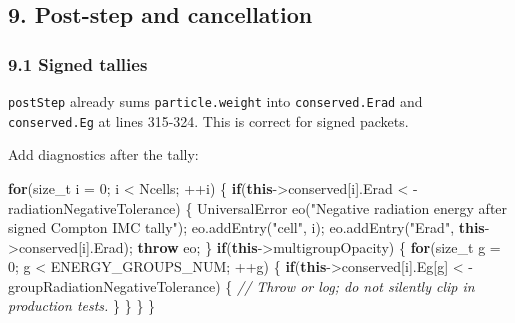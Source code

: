 \documentclass[
]{article}
\newenvironment{Shaded}{}{}
\newcommand{\CommentTok}[1]{\textcolor[rgb]{0.38,0.63,0.69}{\textit{#1}}}
\newcommand{\ControlFlowTok}[1]{\textcolor[rgb]{0.00,0.44,0.13}{\textbf{#1}}}
\newcommand{\DataTypeTok}[1]{\textcolor[rgb]{0.56,0.13,0.00}{#1}}
\newcommand{\DecValTok}[1]{\textcolor[rgb]{0.25,0.63,0.44}{#1}}
\newcommand{\KeywordTok}[1]{\textcolor[rgb]{0.00,0.44,0.13}{\textbf{#1}}}
\newcommand{\NormalTok}[1]{#1}
\newcommand{\OperatorTok}[1]{\textcolor[rgb]{0.40,0.40,0.40}{#1}}
\newcommand{\StringTok}[1]{\textcolor[rgb]{0.25,0.44,0.63}{#1}}
\begin{document}
\subsection{9. Post-step and
cancellation}\label{post-step-and-cancellation}

\subsubsection{9.1 Signed tallies}\label{signed-tallies}

\texttt{postStep} already sums \texttt{particle.weight} into
\texttt{conserved.Erad} and \texttt{conserved.Eg} at lines 315-324. This
is correct for signed packets.

Add diagnostics after the tally:

\begin{Shaded}
\begin{Highlighting}[]
\ControlFlowTok{for}\OperatorTok{(}\DataTypeTok{size\_t}\NormalTok{ i }\OperatorTok{=} \DecValTok{0}\OperatorTok{;}\NormalTok{ i }\OperatorTok{\textless{}}\NormalTok{ Ncells}\OperatorTok{;} \OperatorTok{++}\NormalTok{i}\OperatorTok{)}
\OperatorTok{\{}
    \ControlFlowTok{if}\OperatorTok{(}\KeywordTok{this}\OperatorTok{{-}\textgreater{}}\NormalTok{conserved}\OperatorTok{[}\NormalTok{i}\OperatorTok{].}\NormalTok{Erad }\OperatorTok{\textless{}} \OperatorTok{{-}}\NormalTok{radiationNegativeTolerance}\OperatorTok{)}
    \OperatorTok{\{}
\NormalTok{        UniversalError eo}\OperatorTok{(}\StringTok{"Negative radiation energy after signed Compton IMC tally"}\OperatorTok{);}
\NormalTok{        eo}\OperatorTok{.}\NormalTok{addEntry}\OperatorTok{(}\StringTok{"cell"}\OperatorTok{,}\NormalTok{ i}\OperatorTok{);}
\NormalTok{        eo}\OperatorTok{.}\NormalTok{addEntry}\OperatorTok{(}\StringTok{"Erad"}\OperatorTok{,} \KeywordTok{this}\OperatorTok{{-}\textgreater{}}\NormalTok{conserved}\OperatorTok{[}\NormalTok{i}\OperatorTok{].}\NormalTok{Erad}\OperatorTok{);}
        \ControlFlowTok{throw}\NormalTok{ eo}\OperatorTok{;}
    \OperatorTok{\}}
    \ControlFlowTok{if}\OperatorTok{(}\KeywordTok{this}\OperatorTok{{-}\textgreater{}}\NormalTok{multigroupOpacity}\OperatorTok{)}
    \OperatorTok{\{}
        \ControlFlowTok{for}\OperatorTok{(}\DataTypeTok{size\_t}\NormalTok{ g }\OperatorTok{=} \DecValTok{0}\OperatorTok{;}\NormalTok{ g }\OperatorTok{\textless{}}\NormalTok{ ENERGY\_GROUPS\_NUM}\OperatorTok{;} \OperatorTok{++}\NormalTok{g}\OperatorTok{)}
        \OperatorTok{\{}
            \ControlFlowTok{if}\OperatorTok{(}\KeywordTok{this}\OperatorTok{{-}\textgreater{}}\NormalTok{conserved}\OperatorTok{[}\NormalTok{i}\OperatorTok{].}\NormalTok{Eg}\OperatorTok{[}\NormalTok{g}\OperatorTok{]} \OperatorTok{\textless{}} \OperatorTok{{-}}\NormalTok{groupRadiationNegativeTolerance}\OperatorTok{)}
            \OperatorTok{\{}
                \CommentTok{// Throw or log; do not silently clip in production tests.}
            \OperatorTok{\}}
        \OperatorTok{\}}
    \OperatorTok{\}}
\OperatorTok{\}}
\end{Highlighting}
\end{Shaded}
\end{document}
